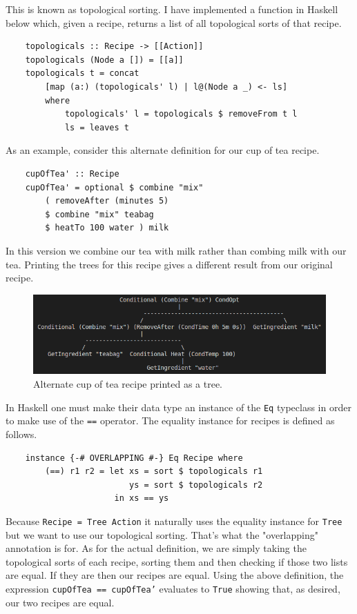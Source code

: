 \documentclass[11pt]{article}
\begin{document}
\medbreak

This is known as topological sorting. I have implemented a
function in Haskell below which, given a recipe, returns a list
of all topological sorts of that recipe.

\begin{lstlisting}
    topologicals :: Recipe -> [[Action]]
    topologicals (Node a []) = [[a]]
    topologicals t = concat
        [map (a:) (topologicals' l) | l@(Node a _) <- ls]
        where
            topologicals' l = topologicals $ removeFrom t l
            ls = leaves t
\end{lstlisting}

As an example, consider this alternate definition for our
cup of tea recipe. 

\begin{lstlisting}
    cupOfTea' :: Recipe
    cupOfTea' = optional $ combine "mix" 
        ( removeAfter (minutes 5)
        $ combine "mix" teabag
        $ heatTo 100 water ) milk
\end{lstlisting}

In this version we combine our tea with milk rather than combing milk with our tea.
Printing the trees for this recipe gives a different result from our original recipe.

\begin{figure}[h]
\includegraphics[width=\textwidth, keepaspectratio]{cupOfTea2.png}
\centering
\caption{Alternate cup of tea recipe printed as a tree.}
\end{figure}

In Haskell one must make their data type an instance of the \texttt{Eq} typeclass in
order to make use of the \texttt{==} operator. The equality instance for recipes is
defined as follows.

\begin{lstlisting}
    instance {-# OVERLAPPING #-} Eq Recipe where
        (==) r1 r2 = let xs = sort $ topologicals r1
                         ys = sort $ topologicals r2
                      in xs == ys
\end{lstlisting}

Because \texttt{Recipe = Tree Action} it naturally uses the equality instance for
\texttt{Tree} but we want to use our topological sorting. That's what the "overlapping"
annotation is for. As for the actual definition, we are simply taking the topological sorts
of each recipe, sorting them and then checking if those two lists are equal. If they are
then our recipes are equal. Using the above definition, the expression \texttt{cupOfTea == cupOfTea'}
evaluates to \texttt{True} showing that, as desired, our two recipes are equal.
\end{document}
